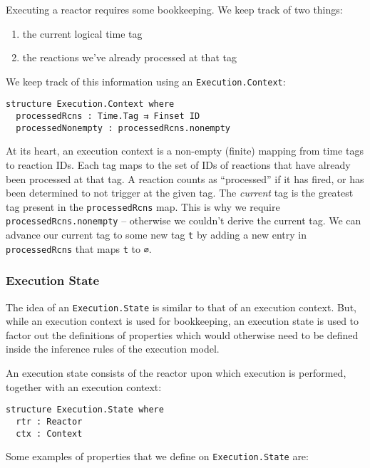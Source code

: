 Executing a reactor requires some bookkeeping.
We keep track of two things:

\begin{enumerate}
  \item the current logical time tag
  \item the reactions we've already processed at that tag
\end{enumerate}

We keep track of this information using an \lstinline{Execution.Context}:

\begin{lstlisting}
structure Execution.Context where
  processedRcns : Time.Tag ⇉ Finset ID
  processedNonempty : processedRcns.nonempty
\end{lstlisting}

At its heart, an execution context is a non-empty (finite) mapping from time tags to reaction IDs.
Each tag maps to the set of IDs of reactions that have already been processed at that tag.
A reaction counts as ``processed'' if it has fired, or has been determined to not trigger at the given tag.
The \emph{current} tag is the greatest tag present in the \lstinline{processedRcns} map.
This is why we require \lstinline{processedRcns.nonempty} -- otherwise we couldn't derive the current tag.
We can advance our current tag to some new tag \lstinline{t} by adding a new entry in \lstinline{processedRcns} that maps \lstinline{t} to \lstinline{∅}.

\subsubsection{Execution State}

The idea of an \lstinline{Execution.State} is similar to that of an execution context.
But, while an execution context is used for bookkeeping, an execution state is used to factor out the definitions of properties which would otherwise need to be defined inside the inference rules of the execution model.

An execution state consists of the reactor upon which execution is performed, together with an execution context:

\begin{lstlisting}
structure Execution.State where
  rtr : Reactor
  ctx : Context
\end{lstlisting}

Some examples of properties that we define on \lstinline{Execution.State} are:

